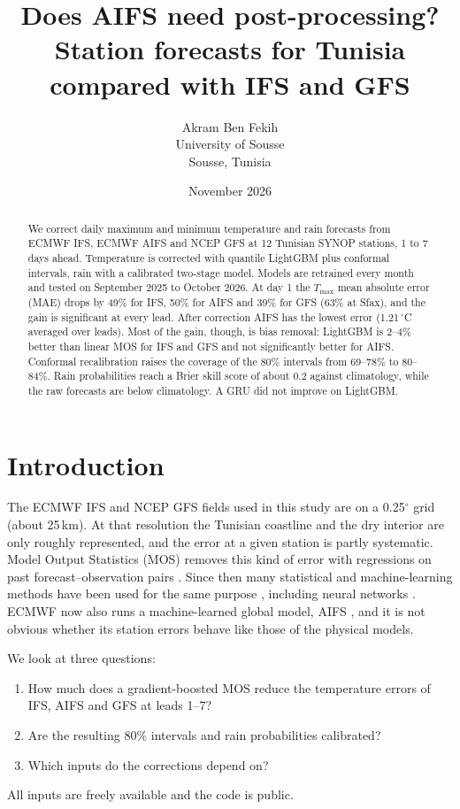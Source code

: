 \documentclass{article}
\title{Does AIFS need post-processing? Station forecasts for Tunisia compared with IFS and GFS}
\author{Akram Ben Fekih \\
  University of Sousse \\
  Sousse, Tunisia}
\date{November 2026}
\begin{document}
\maketitle

\begin{abstract}
We correct daily maximum and minimum temperature and rain forecasts from ECMWF IFS, ECMWF AIFS and NCEP GFS at 12 Tunisian SYNOP stations, 1 to 7 days ahead. Temperature is corrected with quantile LightGBM plus conformal intervals, rain with a calibrated two-stage model. Models are retrained every month and tested on September 2025 to October 2026. At day 1 the $T_{\max}$ mean absolute error (MAE) drops by 49\% for IFS, 50\% for AIFS and 39\% for GFS (63\% at Sfax), and the gain is significant at every lead. After correction AIFS has the lowest error (1.21\,$^\circ$C averaged over leads). Most of the gain, though, is bias removal: LightGBM is 2--4\% better than linear MOS for IFS and GFS and not significantly better for AIFS. Conformal recalibration raises the coverage of the 80\% intervals from 69--78\% to 80--84\%. Rain probabilities reach a Brier skill score of about 0.2 against climatology, while the raw forecasts are below climatology. A GRU did not improve on LightGBM.
\end{abstract}


\section{Introduction}
\label{sec:intro}

The ECMWF IFS and NCEP GFS fields used in this study are on a 0.25$^\circ$ grid (about 25\,km). At that resolution the Tunisian coastline and the dry interior are only roughly represented, and the error at a given station is partly systematic. Model Output Statistics (MOS) removes this kind of error with regressions on past forecast--observation pairs \citep{glahn1972}. Since then many statistical and machine-learning methods have been used for the same purpose \citep{vannitsem2021}, including neural networks \citep{rasp2018}. ECMWF now also runs a machine-learned global model, AIFS \citep{lang2024aifs}, and it is not obvious whether its station errors behave like those of the physical models.

We look at three questions:
\begin{enumerate}
  \item How much does a gradient-boosted MOS reduce the temperature errors of IFS, AIFS and GFS at leads 1--7?
  \item Are the resulting 80\% intervals and rain probabilities calibrated?
  \item Which inputs do the corrections depend on?
\end{enumerate}
All inputs are freely available and the code is public.
\end{document}
